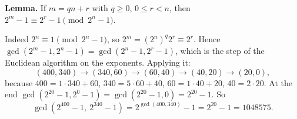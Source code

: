 \textbf{Lemma.} If $m=qn+r$ with $q\ge0$, $0\le r<n$, then $2^m-1\equiv2^r-1\pmod{2^n-1}$.

Indeed $2^n\equiv1\pmod{2^n-1}$, so $2^m=\left(2^n\right)^q2^r\equiv2^r$. Hence $\gcd\left(2^m-1,2^n-1\right)=\gcd\left(2^n-1,2^r-1\right)$, which is the step of the Euclidean algorithm on the exponents. Applying it:
\[(400,340)\to(340,60)\to(60,40)\to(40,20)\to(20,0),\]
because $400=1\cdot340+60$, $340=5\cdot60+40$, $60=1\cdot40+20$, $40=2\cdot20$. At the end $\gcd\left(2^{20}-1,2^0-1\right)=\gcd\left(2^{20}-1,0\right)=2^{20}-1$. So
\[\gcd\left(2^{400}-1,\ 2^{340}-1\right)=2^{\gcd(400,340)}-1=2^{20}-1=\boxed{1048575}.\]
